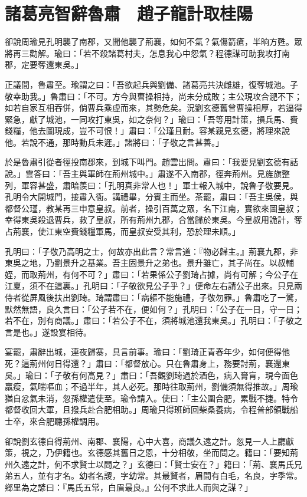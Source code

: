 
\chapter{諸葛亮智辭魯肅　趙子龍計取桂陽}

卻說周瑜見孔明襲了南郡，又聞他襲了荊襄，如何不氣？氣傷箭瘡，半晌方甦。眾將再三勸解。瑜曰：「若不殺諸葛村夫，怎息我心中怨氣？程德謀可助我攻打南郡，定要奪還東吳。」

正議間，魯肅至。瑜謂之曰：「吾欲起兵與劉備、諸葛亮共決雌雄，復奪城池。子敬幸助我。」魯肅曰：「不可。方今與曹操相持，尚未分成敗；主公現攻合淝不下；如若自家互相吞併，倘曹兵乘虛而來，其勢危矣。況劉玄德舊曾曹操相厚，若逼得緊急，獻了城池，一同攻打東吳，如之奈何？」瑜曰：「吾等用計策，損兵馬、費錢糧，他去圖現成，豈不可恨！」肅曰：「公瑾且耐。容某親見玄德，將理來說他。若說不通，那時動兵未遲。」諸將曰：「子敬之言甚善。」

於是魯肅引從者徑投南郡來，到城下叫門。趙雲出問。肅曰：「我要見劉玄德有話說。」雲答曰：「吾主與軍師在荊州城中。」肅遂不入南郡，徑奔荊州。見旌旗整列，軍容甚盛，肅暗羨曰：「孔明真非常人也！」軍士報入城中，說魯子敬要見。孔明令大開城門，接肅入衙。講禮畢，分賓主而坐。茶罷，肅曰：「吾主吳侯，與都督公瑾，教某再三申意皇叔。前者，操引百萬之眾，名下江南，實欲來圖皇叔；幸得東吳殺退曹兵，救了皇叔，所有荊州九郡，合當歸於東吳。今皇叔用詭計，奪占荊襄，使江東空費錢糧軍馬，而皇叔安受其利，恐於理未順。」

孔明曰：「子敬乃高明之士，何故亦出此言？常言道：『物必歸主。』荊襄九郡，非東吳之地，乃劉景升之基業。吾主固景升之弟也。景升雖亡，其子尚在。以叔輔姪，而取荊州，有何不可？」肅曰：「若果係公子劉琦占據，尚有可解；今公子在江夏，須不在這裏。」孔明曰：「子敬欲見公子乎？」便命左右請公子出來。只見兩侍者從屏風後扶出劉琦。琦謂肅曰：「病軀不能施禮，子敬勿罪。」魯肅吃了一驚，默然無語，良久言曰：「公子若不在，便如何？」孔明曰：「公子在一日，守一日；若不在，別有商議。」肅曰：「若公子不在，須將城池還我東吳。」孔明曰：「子敬之言是也。」遂設宴相待。

宴罷，肅辭出城，連夜歸寨，具言前事。瑜曰：「劉琦正青春年少，如何便得他死？這荊州何日得還？」肅曰：「都督放心。只在魯肅身上，務要討荊，襄還東吳。」瑜曰：「子敬有何高見？」肅曰：「吾觀劉琦過於酒色，病入膏肓，現今面色羸瘦，氣喘嘔血；不過半年，其人必死。那時往取荊州，劉備須無得推故。」周瑜猶自忿氣未消，忽孫權遣使至。瑜令請入。使曰：「主公圍合肥，累戰不捷。特令都督收回大軍，且撥兵赴合肥相助。」周瑜只得班師回柴桑養病，令程普部領戰船士卒，來合肥聽孫權調用。

卻說劉玄德自得荊州、南郡、襄陽，心中大喜，商議久遠之計。忽見一人上廳獻策，視之，乃伊籍也。玄德感其舊日之恩，十分相敬，坐而問之。籍曰：「要知荊州久遠之計，何不求賢士以問之？」玄德曰：「賢士安在？」籍曰：「荊、襄馬氏兄弟五人，並有才名。幼者名謖，字幼常。其最賢者，眉間有白毛，名良，字季常。鄉里為之諺曰：『馬氏五常，白眉最良。』公何不求此人而與之謀？」

